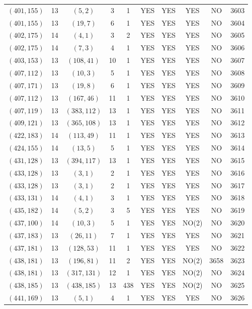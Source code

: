 \begin{longtable}{|c|c|c|c|c|c|c|c|c|c|}
$(401, 155)$ & 13 & $(5, 2)$ & 3 & 1 & YES & YES & YES & NO & 3603\\
$(401, 155)$ & 13 & $(19, 7)$ & 6 & 1 & YES & YES & YES & NO & 3604\\
$(402, 175)$ & 14 & $(4, 1)$ & 3 & 2 & YES & YES & YES & NO & 3605\\
$(402, 175)$ & 14 & $(7, 3)$ & 4 & 1 & YES & YES & YES & NO & 3606\\
$(403, 153)$ & 13 & $(108, 41)$ & 10 & 1 & YES & YES & YES & NO & 3607\\
$(407, 112)$ & 13 & $(10, 3)$ & 5 & 1 & YES & YES & YES & NO & 3608\\
$(407, 171)$ & 13 & $(19, 8)$ & 6 & 1 & YES & YES & YES & NO & 3609\\
$(407, 112)$ & 13 & $(167, 46)$ & 11 & 1 & YES & YES & YES & NO & 3610\\
$(407, 119)$ & 13 & $(383, 112)$ & 13 & 1 & YES & YES & YES & NO & 3611\\
$(409, 121)$ & 13 & $(365, 108)$ & 13 & 1 & YES & YES & YES & NO & 3612\\
$(422, 183)$ & 14 & $(113, 49)$ & 11 & 1 & YES & YES & YES & NO & 3613\\
$(424, 155)$ & 14 & $(13, 5)$ & 5 & 1 & YES & YES & YES & NO & 3614\\
$(431, 128)$ & 13 & $(394, 117)$ & 13 & 1 & YES & YES & YES & NO & 3615\\
$(433, 128)$ & 13 & $(3, 1)$ & 2 & 1 & YES & YES & YES & NO & 3616\\
$(433, 128)$ & 13 & $(3, 1)$ & 2 & 1 & YES & YES & YES & NO & 3617\\
$(433, 131)$ & 14 & $(4, 1)$ & 3 & 1 & YES & YES & YES & NO & 3618\\
$(435, 182)$ & 14 & $(5, 2)$ & 3 & 5 & YES & YES & YES & NO & 3619\\
$(437, 100)$ & 14 & $(10, 3)$ & 5 & 1 & YES & YES & NO(2) & NO & 3620\\
$(437, 183)$ & 13 & $(26, 11)$ & 7 & 1 & YES & YES & YES & NO & 3621\\
$(437, 181)$ & 13 & $(128, 53)$ & 11 & 1 & YES & YES & YES & NO & 3622\\
$(438, 181)$ & 13 & $(196, 81)$ & 11 & 2 & YES & YES & NO(2) & 3658 & 3623\\
$(438, 181)$ & 13 & $(317, 131)$ & 12 & 1 & YES & YES & NO(2) & NO & 3624\\
$(438, 185)$ & 13 & $(438, 185)$ & 13 & 438 & YES & YES & NO(2) & NO & 3625\\
$(441, 169)$ & 13 & $(5, 1)$ & 4 & 1 & YES & YES & YES & NO & 3626\\

\end{longtable}
